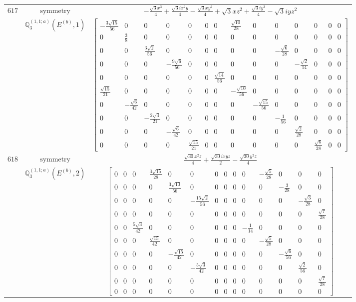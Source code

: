 \documentclass[fleqn,8pt,landscape]{jsarticle}
\begin{document}
\begin{longtable}{ccc}
$ 617 $ & $ \text{symmetry} $ & $ - \frac{\sqrt{3} x^{3}}{4} + \frac{\sqrt{3} i x^{2} y}{4} - \frac{\sqrt{3} x y^{2}}{4} + \sqrt{3} x z^{2} + \frac{\sqrt{3} i y^{3}}{4} - \sqrt{3} i y z^{2} $ \\
$  $ & $ \mathbb{Q}_{3}^{(1,1;a)}(E^{(b)},1) $ & $ \begin{bmatrix} - \frac{3 \sqrt{15}}{56} & 0 & 0 & 0 & 0 & 0 & 0 & \frac{\sqrt{10}}{28} & 0 & 0 & 0 & 0 & 0 & 0 \\ 0 & \frac{3}{8} & 0 & 0 & 0 & 0 & 0 & 0 & 0 & 0 & 0 & 0 & 0 & 0 \\ 0 & 0 & \frac{3 \sqrt{2}}{56} & 0 & 0 & 0 & 0 & 0 & 0 & - \frac{\sqrt{6}}{28} & 0 & 0 & 0 & 0 \\ 0 & 0 & 0 & - \frac{9 \sqrt{6}}{56} & 0 & 0 & 0 & 0 & 0 & 0 & - \frac{\sqrt{2}}{14} & 0 & 0 & 0 \\ 0 & 0 & 0 & 0 & 0 & 0 & \frac{\sqrt{14}}{56} & 0 & 0 & 0 & 0 & 0 & 0 & 0 \\ \frac{\sqrt{15}}{21} & 0 & 0 & 0 & 0 & 0 & 0 & - \frac{\sqrt{10}}{56} & 0 & 0 & 0 & 0 & 0 & 0 \\ 0 & - \frac{\sqrt{6}}{42} & 0 & 0 & 0 & 0 & 0 & 0 & - \frac{\sqrt{15}}{56} & 0 & 0 & 0 & 0 & 0 \\ 0 & 0 & - \frac{2 \sqrt{3}}{21} & 0 & 0 & 0 & 0 & 0 & 0 & - \frac{1}{56} & 0 & 0 & 0 & 0 \\ 0 & 0 & 0 & - \frac{\sqrt{6}}{42} & 0 & 0 & 0 & 0 & 0 & 0 & \frac{\sqrt{2}}{28} & 0 & 0 & 0 \\ 0 & 0 & 0 & 0 & \frac{\sqrt{15}}{21} & 0 & 0 & 0 & 0 & 0 & 0 & \frac{\sqrt{6}}{28} & 0 & 0 \end{bmatrix} $ \\ \hline
$ 618 $ & $ \text{symmetry} $ & $ \frac{\sqrt{30} x^{2} z}{4} + \frac{\sqrt{30} i x y z}{2} - \frac{\sqrt{30} y^{2} z}{4} $ \\
$  $ & $ \mathbb{Q}_{3}^{(1,1;a)}(E^{(b)},2) $ & $ \begin{bmatrix} 0 & 0 & 0 & \frac{3 \sqrt{15}}{28} & 0 & 0 & 0 & 0 & 0 & 0 & - \frac{\sqrt{5}}{28} & 0 & 0 & 0 \\ 0 & 0 & 0 & 0 & \frac{3 \sqrt{10}}{56} & 0 & 0 & 0 & 0 & 0 & 0 & - \frac{3}{28} & 0 & 0 \\ 0 & 0 & 0 & 0 & 0 & - \frac{15 \sqrt{2}}{56} & 0 & 0 & 0 & 0 & 0 & 0 & - \frac{\sqrt{3}}{28} & 0 \\ 0 & 0 & 0 & 0 & 0 & 0 & 0 & 0 & 0 & 0 & 0 & 0 & 0 & \frac{\sqrt{7}}{28} \\ 0 & 0 & \frac{5 \sqrt{3}}{42} & 0 & 0 & 0 & 0 & 0 & 0 & - \frac{1}{14} & 0 & 0 & 0 & 0 \\ 0 & 0 & 0 & \frac{\sqrt{15}}{42} & 0 & 0 & 0 & 0 & 0 & 0 & - \frac{\sqrt{5}}{28} & 0 & 0 & 0 \\ 0 & 0 & 0 & 0 & - \frac{\sqrt{15}}{42} & 0 & 0 & 0 & 0 & 0 & 0 & - \frac{\sqrt{6}}{56} & 0 & 0 \\ 0 & 0 & 0 & 0 & 0 & - \frac{5 \sqrt{3}}{42} & 0 & 0 & 0 & 0 & 0 & 0 & \frac{\sqrt{2}}{56} & 0 \\ 0 & 0 & 0 & 0 & 0 & 0 & 0 & 0 & 0 & 0 & 0 & 0 & 0 & \frac{\sqrt{7}}{28} \\ 0 & 0 & 0 & 0 & 0 & 0 & 0 & 0 & 0 & 0 & 0 & 0 & 0 & 0 \end{bmatrix} $ \\ \hline

\end{longtable}
\end{document}
